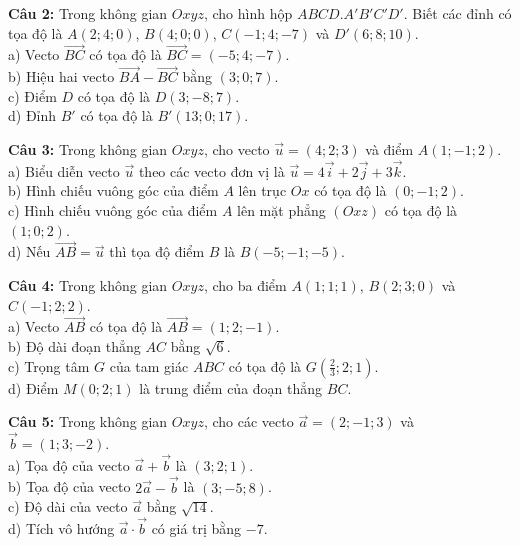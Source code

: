\documentclass[12pt]{article}
\begin{document}
	\vspace{4mm}
	\noindent \textbf{Câu 2:} Trong không gian $Oxyz$, cho hình hộp $ABCD.A'B'C'D'$. Biết các đỉnh có tọa độ là $A(2; 4; 0)$, $B(4; 0; 0)$, $C(-1; 4; -7)$ và $D'(6; 8; 10)$. \\
	\noindent a) Vecto $\vec{BC}$ có tọa độ là $\vec{BC} = (-5; 4; -7)$. \\
	\noindent b) Hiệu hai vecto $\vec{BA} - \vec{BC}$ bằng $(3; 0; 7)$. \\
	\noindent c) Điểm $D$ có tọa độ là $D(3; -8; 7)$. \\
	\noindent d) Đỉnh $B'$ có tọa độ là $B'(13; 0; 17)$.
	
	\vspace{4mm}
	\noindent \textbf{Câu 3:} Trong không gian $Oxyz$, cho vecto $\vec{u} = (4; 2; 3)$ và điểm $A(1; -1; 2)$. \\
	\noindent a) Biểu diễn vecto $\vec{u}$ theo các vecto đơn vị là $\vec{u} = 4\vec{i} + 2\vec{j} + 3\vec{k}$. \\
	\noindent b) Hình chiếu vuông góc của điểm $A$ lên trục $Ox$ có tọa độ là $(0; -1; 2)$. \\
	\noindent c) Hình chiếu vuông góc của điểm $A$ lên mặt phẳng $(Oxz)$ có tọa độ là $(1; 0; 2)$. \\
	\noindent d) Nếu $\vec{AB} = \vec{u}$ thì tọa độ điểm $B$ là $B(-5; -1; -5)$.
	
	\vspace{4mm}
	\noindent \textbf{Câu 4:} Trong không gian $Oxyz$, cho ba điểm $A(1; 1; 1)$, $B(2; 3; 0)$ và $C(-1; 2; 2)$. \\
	\noindent a) Vecto $\vec{AB}$ có tọa độ là $\vec{AB} = (1; 2; -1)$. \\
	\noindent b) Độ dài đoạn thẳng $AC$ bằng $\sqrt{6}$. \\
	\noindent c) Trọng tâm $G$ của tam giác $ABC$ có tọa độ là $G\left(\frac{2}{3}; 2; 1\right)$. \\
	\noindent d) Điểm $M(0; 2; 1)$ là trung điểm của đoạn thẳng $BC$.
	
	\vspace{4mm}
	\noindent \textbf{Câu 5:} Trong không gian $Oxyz$, cho các vecto $\vec{a} = (2; -1; 3)$ và $\vec{b} = (1; 3; -2)$. \\
	\noindent a) Tọa độ của vecto $\vec{a} + \vec{b}$ là $(3; 2; 1)$. \\
	\noindent b) Tọa độ của vecto $2\vec{a} - \vec{b}$ là $(3; -5; 8)$. \\
	\noindent c) Độ dài của vecto $\vec{a}$ bằng $\sqrt{14}$. \\
	\noindent d) Tích vô hướng $\vec{a} \cdot \vec{b}$ có giá trị bằng $-7$.
	
\end{document}
